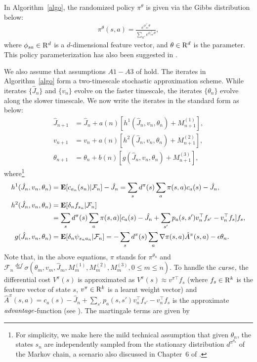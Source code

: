 \begin{remark}
In Algorithm~\ref{algo}, the randomized policy $\pi^\theta$ is given via the Gibbs distribution below:
\begin{align}
\pi^\theta(s,a)=\frac{e^{\phi_{sa}^\top \theta}}{\sum_{a'} e^{\phi_{sa'}^\top \theta}},
\end{align}
where $\phi_{sa} \in \mathrm{R}^d$ is a $d$-dimensional feature vector, and $\theta\in \mathrm{R}^d$ is the parameter. 
This policy parameterization has also been suggested in \cite{NAC}.
\end{remark}
We also assume that assumptions ${A1-A3}$ of \cite{NAC} hold. The iterates in Algorithm~\ref{algo} form a 
two-timescale stochastic approximation scheme. While iterates $\{\hat{J}_n\}$ and $\{v_n\}$ evolve on the 
faster timescale, the iterates $\{\theta_n\}$ evolve along the slower timescale. We now write the iterates 
in the standard form as below:
\begin{align}
\label{fast}\hat{J}_{n+1}&=\hat{J}_n+a(n)[h^1(\hat{J}_n,v_n,\theta_n)+M^{(1)}_{n+1}],\\
\label{inter}v_{n+1}&=v_n+a(n)[h^2(\hat{J}_n,v_n,\theta_n)+M^{(2)}_{n+1}],\\
\label{slow}\theta_{n+1}&=\theta_n+b(n)[g(\hat{J}_n,v_n,\theta_n)+M^{(3)}_{n+1}],
\end{align}
where\footnote{For simplicity, we make here the mild technical assumption that given $\theta_n$, the states $s_n$ are independently sampled from the stationary distribution $d^{\pi^{\theta_n}}$ of the Markov chain, a scenario also discussed in Chapter~$6$ of \cite{ndp}.}
\begin{align}
\label{h1func}h^1(\hat{J}_n,v_n,\theta_n)&= \mathbf{E}[c_{a_n}(s_n)|\mathcal{F}_n]-\hat{J}_n=\sum_s d^\pi(s) \sum_a \pi(s,a) c_a(s)-\hat{J}_n,\\
\label{h2func}h^2(\hat{J}_n,v_n,\theta_n)&= \mathbf{E}[\delta_nf_{s_n}|\mathcal{F}_n]\nonumber\\&=\sum_s d^\pi(s)\sum_a \pi(s,a)[c_a(s)-\hat{J_n}+\sum_{s'}p_a(s,s') v^\top_nf_{s'}-v^\top_nf_s ]f_s,\\
\label{gfunc}g(\hat{J}_n,v_n,\theta_n)&= \mathbf{E}[\delta_n\psi_{s_na_n}|\mathcal{F}_n]=-\sum_s d^\pi(s)\sum_a \nabla \pi(s,a)\hat{A}^\pi(s,a)-\epsilon \theta_n.
\end{align}
Note that, in the above equations, $\pi$ stands for $\pi^{\theta_n}$ and\\ $\mathcal{F}_n\stackrel{def}{=}\sigma(\theta_m,v_m,\hat{J}_m,M^{(1)}_m,M^{(2)}_m,M^{(3)}_m,0\leq m\leq n)$. To handle the $\emph{curse}$, the differential cost $V^\pi(s)$ is approximated as $ V^\pi(s)\approx v^{\pi\top} f_s$ (where $f_s\in \mathrm{R}^k$ is the feature vector of state $s$, $v^\pi \in \mathrm{R}^k$ is a learnt weight vector) and $\hat{A}^\pi(s,a)=c_a(s)-\hat{J}_n+\sum_{s'}p_a(s,s')v^\top_n f_{s'}-v^\top_n f_s$ is the approximate $\emph{advantage}$-function (see \cite{NAC}). The martingale terms are given by

